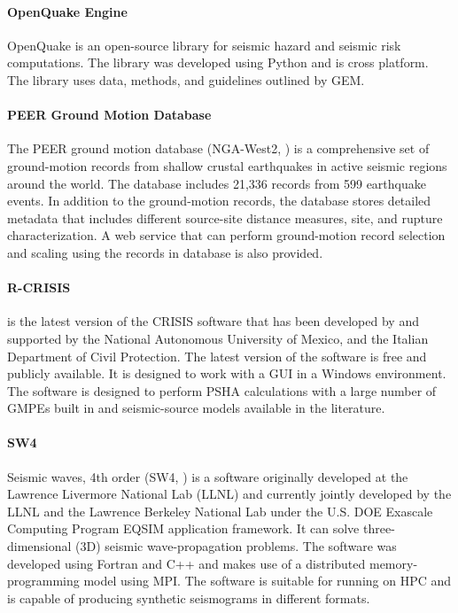 \paragraph{OpenQuake Engine} OpenQuake \citep{pagani2014openquake} is an open-source library for seismic hazard and seismic risk computations. The library was developed using Python and is cross platform. The library uses data, methods, and guidelines outlined by GEM.

\paragraph{PEER Ground Motion Database} The PEER ground motion database (NGA-West2, \cite{ancheta2014ngawest2}) is a comprehensive set of ground-motion records from shallow crustal earthquakes in active seismic regions around the world. The database includes 21,336 records from 599 earthquake events. In addition to the ground-motion records, the database stores detailed metadata that includes different source-site distance measures, site, and rupture characterization. A web service that can perform ground-motion record selection and scaling using the records in database is also provided.

\paragraph{R-CRISIS }  is the latest version of the CRISIS software that has been developed by \cite{ordaz2013crisis2008} and supported by the National Autonomous University of Mexico, and the Italian Department of Civil Protection. The latest version of the software is free and publicly available. It is designed to work with a GUI in a Windows environment. The software is designed to perform PSHA calculations with a large number of GMPEs built in and seismic-source models available in the literature.

\paragraph{SW4} Seismic waves, 4th order (SW4, \cite{petersson2017geodynamics}) is a software originally developed at the Lawrence Livermore National Lab (LLNL) and currently jointly developed by the LLNL and the Lawrence Berkeley National Lab under the U.S. DOE Exascale Computing Program EQSIM application framework. It can solve three-dimensional (3D) seismic wave-propagation problems. The software was developed using Fortran and C++ and makes use of a distributed memory-programming model using MPI. The software is suitable for running on HPC and is capable of producing synthetic seismograms in different formats.

